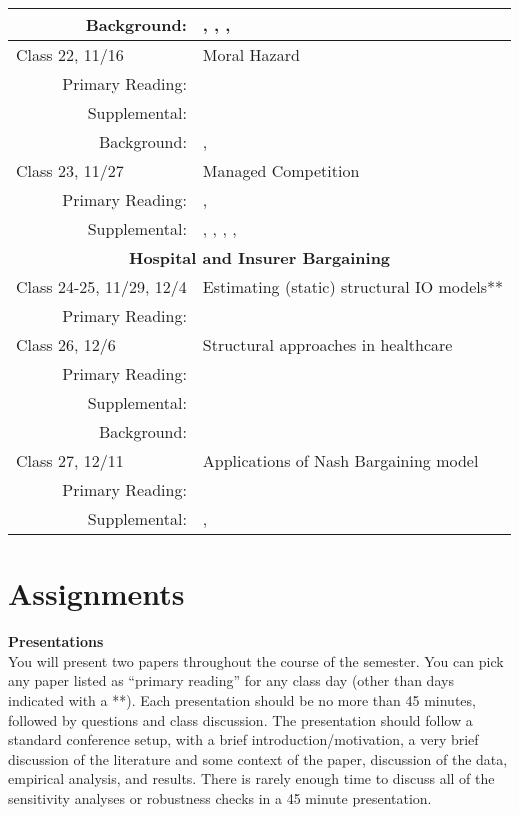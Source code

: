 \documentclass{article}
\begin{document}
\begin{longtable}{lp{11cm}}
          \multicolumn{1}{r}{Background:} & \cite{ackerloff1970}, \cite{frank2000}, \cite{rothschild1976}, \cite{einav2011} \\
  \hline
  Class 22, 11/16 & Moral Hazard \\
          \multicolumn{1}{r}{Primary Reading:} &  \cite{einav2013} \\
          \multicolumn{1}{r}{Supplemental:} & \cite{manning1996} \\
          \multicolumn{1}{r}{Background:} & \cite{finkelstein2014}, \cite{einav2017} \\
  \hline
  Class 23, 11/27 & Managed Competition \\
          \multicolumn{1}{r}{Primary Reading:} &  \cite{curto2015}, \cite{einav2015} \\
          \multicolumn{1}{r}{Supplemental:} & \cite{song2013}, \cite{cabral2014}, \cite{stockley2014}, \cite{duggan2016}, \cite{pelech2018} \\
  \hline
  \multicolumn{2}{c}{\textbf{Hospital and Insurer Bargaining}} \\
  \hline\hline
  Class 24-25, 11/29, 12/4 & Estimating (static) structural IO models** \\
          \multicolumn{1}{r}{Primary Reading:} & \cite{reiss2007} \\
  \hline
  Class 26, 12/6 & Structural approaches in healthcare \\
          \multicolumn{1}{r}{Primary Reading:} & \cite{abraham2007}   \\
          \multicolumn{1}{r}{Supplemental:} & \cite{town2003} \\
          \multicolumn{1}{r}{Background:} & \cite{bresnahan1991} \\
  \hline
  Class 27, 12/11 & Applications of Nash Bargaining model \\
          \multicolumn{1}{r}{Primary Reading: } &  \cite{ho2017} \\
          \multicolumn{1}{r}{Supplemental:} & \cite{gowrisankaran2015}, \cite{lewis2015}
\end{longtable}


\pagebreak
\section*{Assignments}

\noindent \textbf{Presentations} \\
You will present two papers throughout the course of the semester. You can pick any paper listed as ``primary reading'' for any class day (other than days indicated with a **). Each presentation should be no more than 45 minutes, followed by questions and class discussion. The presentation should follow a standard conference setup, with a brief introduction/motivation, a very brief discussion of the literature and some context of the paper, discussion of the data, empirical analysis, and results. There is rarely enough time to discuss all of the sensitivity analyses or robustness checks in a 45 minute presentation.
\end{document}
